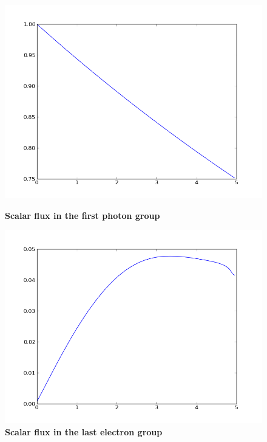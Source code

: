 \begin{figure}[H]
\begin{minipage}[b]{0.42\linewidth}
\centering
\includegraphics[width=\linewidth]{./images/al/group_0_moment_0}
\caption{\bf{Scalar flux in the first photon group}}
\label{test1}
\end{minipage}
\hspace{0.5cm}
\begin{minipage}[b]{0.42\linewidth}
\centering
\includegraphics[width=\linewidth]{./images/al/group_39_moment_0}
\caption{\bf{Scalar flux in the last electron group}}
\label{test2}
\end{minipage}
\end{figure}

